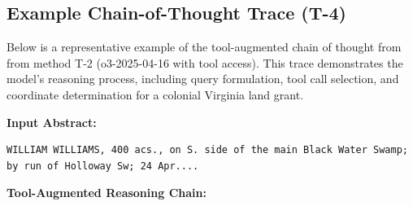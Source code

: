 \subsection{Example Chain-of-Thought Trace
(T-4)}\label{a.3-example-chain-of-thought-trace-t-4}

Below is a representative example of the tool-augmented chain of thought
from from method T-2 (o3-2025-04-16 with tool access). This trace
demonstrates the model's reasoning process, including query formulation,
tool call selection, and coordinate determination for a colonial
Virginia land grant.

\textbf{Input Abstract:}

\begin{lstlisting}
WILLIAM WILLIAMS, 400 acs., on S. side of the main Black Water Swamp; by run of Holloway Sw; 24 Apr....
\end{lstlisting}

\textbf{Tool-Augmented Reasoning Chain:}

